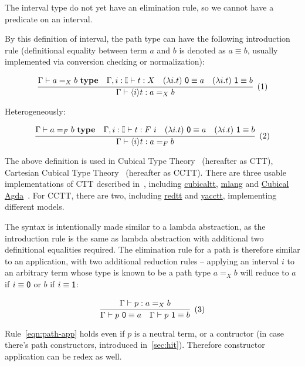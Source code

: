 The interval type do not yet have an elimination rule,
so we cannot have a predicate on an interval.

By this definition of interval, the path type can
have the following introduction rule
(definitional equality between term $a$ and $b$
is denoted as $a \equiv b$,
usually implemented via conversion checking or normalization):

\[
  \cfrac{
    \Gamma \vdash a =_X b \ \textbf{type}
    \quad
    \Gamma, i : \mathbb I \vdash t : X
    \quad
    (\lambda i. t) \ \textsf 0 \equiv a
    \quad
    (\lambda i. t) \ \textsf 1 \equiv b
  }{
    \Gamma \vdash \lrangle i t : a =_X b
  }
  \xtag
\]

Heterogeneously:

\[
  \cfrac{
    \Gamma \vdash a =_F b \ \textbf{type}
    \quad
    \Gamma, i : \mathbb I \vdash t : F \ i
    \quad
    (\lambda i. t) \ \textsf 0 \equiv a
    \quad
    (\lambda i. t) \ \textsf 1 \equiv b
  }{
    \Gamma \vdash \lrangle i t : a =_F b
  }
  \xtag
\]

The above definition is used in Cubical Type Theory~\cite{CCHM,CHM}
(hereafter as CTT), Cartesian Cubical Type
Theory~\cite{CCTT,CCTT2,CHTT} (hereafter as CCTT).
There are three usable implementations of CTT described in~\cite{CHM},
including \href{https://github.com/mortberg/cubicaltt}{cubicaltt},
\href{https://github.com/molikto/mlang}{mlang} and
\href{https://agda.readthedocs.io/en/v2.6.0.1/language/cubical.html}
{Cubical Agda}~\cite{CubicalAgda}.
For CCTT, there are two, including
\href{https://github.com/RedPRL/redtt}{redtt}
and \href{https://github.com/mortberg/yacctt}{yacctt},
implementing different models.

The syntax is intentionally made similar to a lambda abstraction,
as the introduction rule is the same as lambda abstraction with
additional two definitional equalities required.
The elimination rule for a path is therefore similar to an application,
with two additional reduction rules -- applying an interval $i$ to
an arbitrary term whose type is known to be a path type $a =_X b$
will reduce to $a$ if $i \equiv \textsf 0$ or $b$ if $i \equiv \textsf 1$:

\[
  \cfrac{
    \Gamma \vdash p : a =_X b
  }{
    \Gamma \vdash p\ \textsf 0 \equiv a
    \quad
    \Gamma \vdash p\ \textsf 1 \equiv b
  }
  \xtag \label{eqn:path-app}
\]

Rule~\ref{eqn:path-app} holds even if $p$ is a neutral term,
or a contructor (in case there's path constructors,
introduced in~\cref{sec:hit}).
Therefore constructor application can be redex as well.


